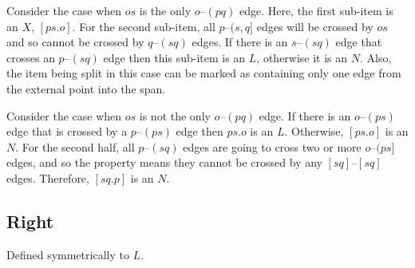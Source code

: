 Consider the case when $os$ is the only $o$--$(pq)$ edge.
Here, the first sub-item is an $X$, $[ps.o]$.
For the second sub-item, all $p$--$(s, q]$ edges will be crossed by $os$ and so cannot be crossed by $q$--$(sq)$ edges.
If there is an $s$--$(sq)$ edge that crosses an $p$--$(sq)$ edge then this sub-item is an $L$, otherwise it is an $N$.
Also, the item being split in this case can be marked as containing only one edge from the external point into the span.


\begin{center}
\end{center}

Consider the case when $os$ is not the only $o$--$(pq)$ edge.
If there is an $o$--$(ps)$ edge that is crossed by a $p$--$(ps)$ edge then $ps.o$ is an $L$.
Otherwise, $[ps.o]$ is an $N$.
For the second half, all $p$--$(sq)$ edges are going to cross two or more $o$--$(ps]$ edges, and so the \oneEC property means they cannot be crossed by any $[sq]$--$[sq]$ edges.
Therefore, $[sq.p]$ is an $N$.


\subsection{Right}
Defined symmetrically to $L$.

